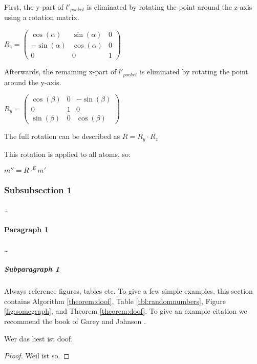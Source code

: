First, the y-part of $l'_{pocket}$ is eliminated by rotating the point around the z-axis using a rotation matrix.

$
R_z =
\begin{pmatrix}
  \cos(\alpha) & \sin(\alpha) & 0 \\
  -\sin(\alpha) & \cos(\alpha) & 0 \\
  0 & 0 & 1
\end{pmatrix}
$

Afterwards, the remaining x-part of $l'_{pocket}$ is eliminated by rotating the point around the y-axis.

$
R_y =
\begin{pmatrix}
  \cos(\beta) & 0 & -\sin(\beta) \\
  0 & 1 & 0 \\
  \sin(\beta) & 0 & \cos(\beta) 
\end{pmatrix}
$

The full rotation can be described as $R = R_y \cdot R_z$

This rotation is applied to all atoms, so:

$m'' = R \cdot^E m'$


\subsubsection{Subsubsection 1}

\dots

\paragraph{Paragraph 1}

\dots

\subparagraph{Subparagraph 1} Always reference figures, tables etc. To give a few simple examples, this section contains Algorithm \ref{theorem:doof}, Table \ref{tbl:randomnumbers}, Figure \ref{fig:somegraph}, and Theorem \ref{theorem:doof}. To give an example citation we recommend the book of Garey and Johnson \cite{gj-ci-79}.

\begin{theorem}
\label{theorem:doof}
  Wer das liest ist doof.
\end{theorem}
\begin{proof}
  Weil ist so.
\end{proof}

